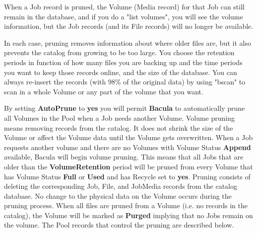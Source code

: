 When a Job record is pruned, the Volume (Media record) for that Job can still
remain in the database, and if you do a "list volumes", you will see the
volume information, but the Job records (and its File records) will no longer
be available. 

In each case, pruning removes information about where older files are, but it
also prevents the catalog from growing to be too large. You choose the
retention periods in function of how many files you are backing up and the
time periods you want to keep those records online, and the size of the
database. You can always re-insert the records (with 98\% of the original data)
by using "bscan" to scan in a whole Volume or any part of the volume that
you want. 

By setting {\bf AutoPrune} to {\bf yes} you will permit {\bf Bacula} to
automatically prune all Volumes in the Pool when a Job needs another Volume.
Volume pruning means removing records from the catalog. It does not shrink the
size of the Volume or affect the Volume data until the Volume gets
overwritten. When a Job requests another volume and there are no Volumes with
Volume Status {\bf Append} available, Bacula will begin volume pruning. This
means that all Jobs that are older than the {\bf VolumeRetention} period will
be pruned from every Volume that has Volume Status {\bf Full} or {\bf Used}
and has Recycle set to {\bf yes}. Pruning consists of deleting the
corresponding Job, File, and JobMedia records from the catalog database. No
change to the physical data on the Volume occurs during the pruning process.
When all files are pruned from a Volume (i.e. no records in the catalog), the
Volume will be marked as {\bf Purged} implying that no Jobs remain on the
volume. The Pool records that control the pruning are described below. 

